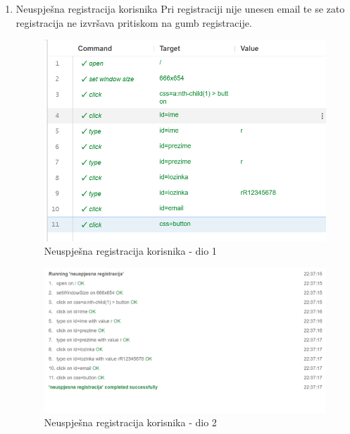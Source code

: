 \begin{enumerate}
				\item Neuspješna registracija korisnika\newline
				Pri registraciji nije unesen email te se zato registracija ne izvršava pritiskom na gumb registracije.
				\begin{figure}[H]
					\includegraphics[scale=0.40]{slike/deploy/fTest3a.png}
					\centering
					\caption{Neuspješna registracija korisnika - dio 1}
					\label{fig:fTest3a}
				\end{figure}
				\begin{figure}[H]
					\includegraphics[scale=0.40]{slike/deploy/fTest3b.png}
					\centering
					\caption{Neuspješna registracija korisnika - dio 2}
					\label{fig:fTest3b}
				\end{figure}
				
				\setcounter{enumi}{3}
				

\end{enumerate}
